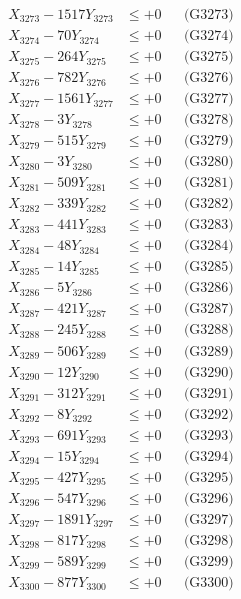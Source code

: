 \documentclass[a4paper,10pt]{article}
\begin{document}
{\begin{align}
X_{3273} - 1517Y_{3273} &\leq +0 && \text{(G3273)} \\
X_{3274} - 70Y_{3274} &\leq +0 && \text{(G3274)} \\
X_{3275} - 264Y_{3275} &\leq +0 && \text{(G3275)} \\
X_{3276} - 782Y_{3276} &\leq +0 && \text{(G3276)} \\
X_{3277} - 1561Y_{3277} &\leq +0 && \text{(G3277)} \\
X_{3278} - 3Y_{3278} &\leq +0 && \text{(G3278)} \\
X_{3279} - 515Y_{3279} &\leq +0 && \text{(G3279)} \\
X_{3280} - 3Y_{3280} &\leq +0 && \text{(G3280)} \\
\allowbreak
X_{3281} - 509Y_{3281} &\leq +0 && \text{(G3281)} \\
X_{3282} - 339Y_{3282} &\leq +0 && \text{(G3282)} \\
X_{3283} - 441Y_{3283} &\leq +0 && \text{(G3283)} \\
X_{3284} - 48Y_{3284} &\leq +0 && \text{(G3284)} \\
X_{3285} - 14Y_{3285} &\leq +0 && \text{(G3285)} \\
X_{3286} - 5Y_{3286} &\leq +0 && \text{(G3286)} \\
X_{3287} - 421Y_{3287} &\leq +0 && \text{(G3287)} \\
X_{3288} - 245Y_{3288} &\leq +0 && \text{(G3288)} \\
X_{3289} - 506Y_{3289} &\leq +0 && \text{(G3289)} \\
X_{3290} - 12Y_{3290} &\leq +0 && \text{(G3290)} \\
\allowbreak
X_{3291} - 312Y_{3291} &\leq +0 && \text{(G3291)} \\
X_{3292} - 8Y_{3292} &\leq +0 && \text{(G3292)} \\
X_{3293} - 691Y_{3293} &\leq +0 && \text{(G3293)} \\
X_{3294} - 15Y_{3294} &\leq +0 && \text{(G3294)} \\
X_{3295} - 427Y_{3295} &\leq +0 && \text{(G3295)} \\
X_{3296} - 547Y_{3296} &\leq +0 && \text{(G3296)} \\
X_{3297} - 1891Y_{3297} &\leq +0 && \text{(G3297)} \\
X_{3298} - 817Y_{3298} &\leq +0 && \text{(G3298)} \\
X_{3299} - 589Y_{3299} &\leq +0 && \text{(G3299)} \\
X_{3300} - 877Y_{3300} &\leq +0 && \text{(G3300)} \\

\end{align}}
\end{document}
